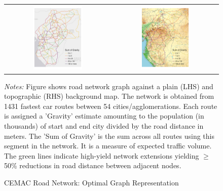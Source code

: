 \documentclass[a4paper]{article}
\begin{document}
\begin{figure}[H] 
\centering
\caption{\label{fig:ROADS} CEMAC Road Network: Optimal Graph Representation}
\begin{tabular}{cc}
\includegraphics[width=0.48\textwidth]{"../figures/trans_CEMAC_network_actual_discretized_gravity_new_roads_real_edges.pdf"} &
\includegraphics[width=0.48\textwidth]{"../figures/trans_CEMAC_network_actual_discretized_gravity_new_roads_OpenTopoMap.pdf"} \\ [-0.2em]
\end{tabular}
\raggedright
\scriptsize 
\emph{Notes:} Figure shows road network graph against a plain (LHS) and topographic (RHS) background map. The network is obtained from 1431 fastest car routes between 54 cities/agglomerations. Each route is assigned a 'Gravity' estimate amounting to the population (in thousands) of start and end city divided by the road distance in meters. The 'Sum of Gravity' is the sum across all routes using this segment in the network. It is a measure of expected traffic volume. The green lines indicate high-yield network extensions yielding $\geq$50\% reductions in road distance between adjacent nodes. %
\end{figure}
\end{document}
